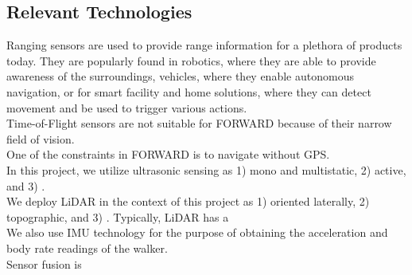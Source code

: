 \subsection{Relevant Technologies}

\noindent Ranging sensors are used to provide range information for a plethora of products today. They are popularly found in robotics, where they are able to provide awareness of the surroundings, vehicles, where they enable autonomous navigation, or for smart facility and home solutions, where they can detect movement and be used to trigger various actions.\\

\noindent Time-of-Flight sensors are not suitable for FORWARD because of their narrow field of vision.\\

\noindent One of the constraints in FORWARD is to navigate without GPS.\\

\noindent In this project, we utilize ultrasonic sensing as 1) mono and multistatic, 2) active, and 3) .\\

\noindent We deploy LiDAR in the context of this project as 1) oriented laterally, 2) topographic, and 3) . Typically, LiDAR has a \\

\noindent We also use IMU technology for the purpose of obtaining the acceleration and body rate readings of the walker.\\

\noindent Sensor fusion is  \\


